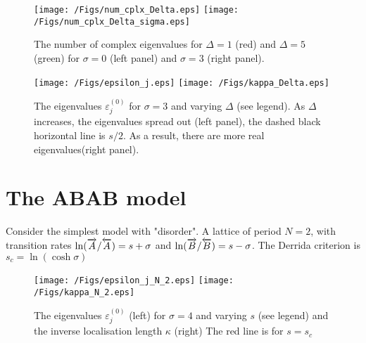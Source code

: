 \documentclass[aps,pre,floats,floatfix,fleqn,notitlepage]{revtex4-1}
\newcommand{\ola}{\protect\overleftarrow}
\newcommand{\ora}{\protect\overrightarrow}
\begin{document}
\begin{figure}[h]
\texttt{[image: /Figs/num\_cplx\_Delta.eps]}
\texttt{[image: /Figs/num\_cplx\_Delta\_sigma.eps]}
\caption{The number of complex eigenvalues for $\Delta=1$ (red) and $\Delta=5$ (green) for $\sigma=0$ (left panel) and $\sigma = 3$ (right panel).
}
\label{fig8}
\end{figure}

\begin{figure}[h]
\texttt{[image: /Figs/epsilon\_j.eps]}
\texttt{[image: /Figs/kappa\_Delta.eps]}
\caption{The eigenvalues $\varepsilon_j^{(0)}$ for $\sigma=3$ and varying $\Delta$ (see legend). As $\Delta$ increases, the eigenvalues spread out (left panel), the dashed  black horizontal line is $s/2$. As a result, 
there are more real eigenvalues(right panel).
}
\label{fig9}
\end{figure}

\clearpage
\section{The ABAB model}
Consider the simplest model with "disorder". A lattice of period $N=2$, with transition rates 
$\ln(\ora{A}/\ola{A}) = s+\sigma$ and $\ln(\ora{B}/\ola{B}) = s-\sigma$.
The Derrida criterion is $s_c = \ln(\cosh \sigma)$

\begin{figure}[h]
\texttt{[image: /Figs/epsilon\_j\_N\_2.eps]}
\texttt{[image: /Figs/kappa\_N\_2.eps]}
\caption{The eigenvalues $\varepsilon_j^{(0)}$ (left) for $\sigma=4$ and varying $s$ (see legend)
and the inverse localisation length $\kappa$ (right)
The red line is for $s=s_c$}
\label{fig10}
\end{figure}


\end{document}
